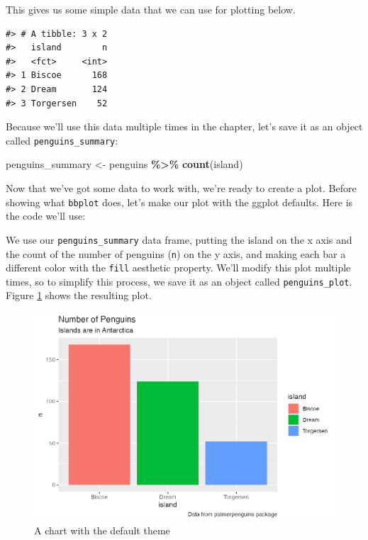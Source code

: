 \documentclass[
]{book}
\newenvironment{Shaded}{\begin{snugshade}}{\end{snugshade}}
\newcommand{\FunctionTok}[1]{\textcolor[rgb]{0.13,0.29,0.53}{\textbf{#1}}}
\newcommand{\NormalTok}[1]{#1}
\newcommand{\OtherTok}[1]{\textcolor[rgb]{0.56,0.35,0.01}{#1}}
\newcommand{\SpecialCharTok}[1]{\textcolor[rgb]{0.81,0.36,0.00}{\textbf{#1}}}
\begin{document}
This gives us some simple data that we can use for plotting below.

\begin{verbatim}
#> # A tibble: 3 x 2
#>   island        n
#>   <fct>     <int>
#> 1 Biscoe      168
#> 2 Dream       124
#> 3 Torgersen    52
\end{verbatim}

Because we'll use this data multiple times in the chapter, let's save it as an object called \texttt{penguins\_summary}:

\begin{Shaded}
\begin{Highlighting}[]
\NormalTok{penguins\_summary }\OtherTok{\textless{}{-}}\NormalTok{ penguins }\SpecialCharTok{\%\textgreater{}\%}
  \FunctionTok{count}\NormalTok{(island)}
\end{Highlighting}
\end{Shaded}

Now that we've got some data to work with, we're ready to create a plot. Before showing what \texttt{bbplot} does, let's make our plot with the ggplot defaults. Here is the code we'll use:

We use our \texttt{penguins\_summary} data frame, putting the island on the x axis and the count of the number of penguins (\texttt{n}) on the y axis, and making each bar a different color with the \texttt{fill} aesthetic property. We'll modify this plot multiple times, so to simplify this process, we save it as an object called \texttt{penguins\_plot}. Figure \ref{fig:basic-penguins-plot-plot} shows the resulting plot.

\begin{figure}
\includegraphics[width=1\linewidth]{custom-theme_files/figure-latex/basic-penguins-plot-plot-1} \caption{A chart with the default theme}\label{fig:basic-penguins-plot-plot}
\end{figure}
\end{document}
